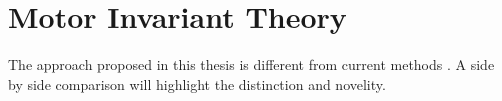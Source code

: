 %

\section{Motor Invariant Theory}

The approach proposed in this thesis is different from current \cms methods .
A side by side comparison will highlight the distinction and novelity. 


